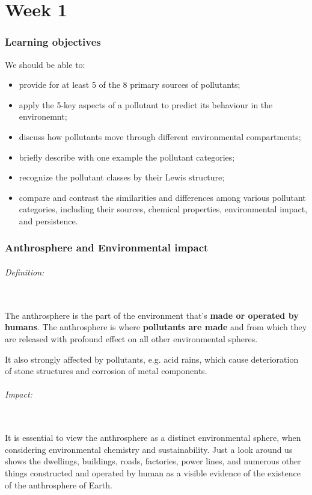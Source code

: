 \documentclass{article}
\newcommand{\pph}[1]{\paragraph{#1}\phantom{}\\}
\begin{document}
\newpage
\part{Week 1}
\section{Learning objectives}
We should be able to:
\begin{itemize}
    \item provide for at least 5 of the 8 primary sources of pollutants;
    \item apply the 5-key aspects of a pollutant to predict its behaviour in the environemnt;
    \item discuss how pollutants move through different environmental compartments;
    \item briefly describe with one example the pollutant categories;
    \item recognize the pollutant classes by their Lewis structure;
    \item compare and contrast the similarities and differences among various pollutant categories,
        including their sources, chemical properties, environmental impact, and persistence.
\end{itemize}

\newpage
\section{Anthrosphere and Environmental impact}
\pph{Definition:}
The anthrosphere is the part of the environment that's \textbf{made
or operated by humans}. The anthrosphere is where \textbf{pollutants are made} and
from which they are released with profound effect on all other environmental spheres.

It also strongly affected by pollutants, e.g. acid rains, which cause deterioration of
stone structures and corrosion of metal components.

\pph{Impact:}
It is essential to view the anthrosphere as a distinct environmental sphere,
when considering environmental chemistry and sustainability. Just a look around
us shows the dwellings, buildings, roads, factories, power lines, and numerous
other things constructed and operated by human as a visible evidence of the
existence of the anthrosphere of Earth.
\end{document}
